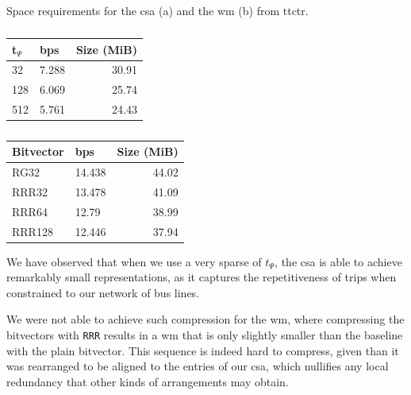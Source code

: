    \begin{table}
        \caption{Space requirements for the \acrlong{csa} (a) and the \acrlong{wm} (b) from \acrshort{ttctr}.}
        \label{tab:ttctr}
        \begin{subtable}[t]{.30\linewidth}
        \vspace{-12pt}
        \caption{}
        \begin{tabular}[t]{|l|l|r|}
            \hline
            t$_\Psi$ & bps & Size (MiB) \\
             \hline
            32 & 7.288 & 30.91 \\
            128 & 6.069 & 25.74 \\
            512 & 5.761 & 24.43 \\
            \hline
        \end{tabular}
        \end{subtable}%
        \begin{subtable}[t]{.40\linewidth}
        \vspace{-12pt}
        \caption{}
        \begin{tabular}[t]{|l|l|r|}
            \hline
            Bitvector & bps & Size (MiB) \\
             \hline
            RG32 & 14.438 & 44.02 \\
            RRR32 & 13.478 & 41.09 \\
            RRR64 & 12.79 & 38.99 \\
            RRR128 & 12.446 & 37.94 \\
            \hline
        \end{tabular}
        \end{subtable}
    \end{table}
    
    We have observed that when we use a very sparse of $t_\Psi$, the \gls{csa} is able to achieve remarkably small representations, as it captures the repetitiveness of trips when constrained to our network of bus lines.
    
    We were not able to achieve such compression for the \gls{wm}, where compressing the bitvectors with \texttt{RRR} results in a \gls{wm} that is only slightly smaller than the baseline with the plain bitvector. This sequence is indeed hard to compress, given than it was rearranged to be aligned to the entries of our \gls{csa}, which nullifies any local redundancy that other kinds of arrangements may obtain.
    

